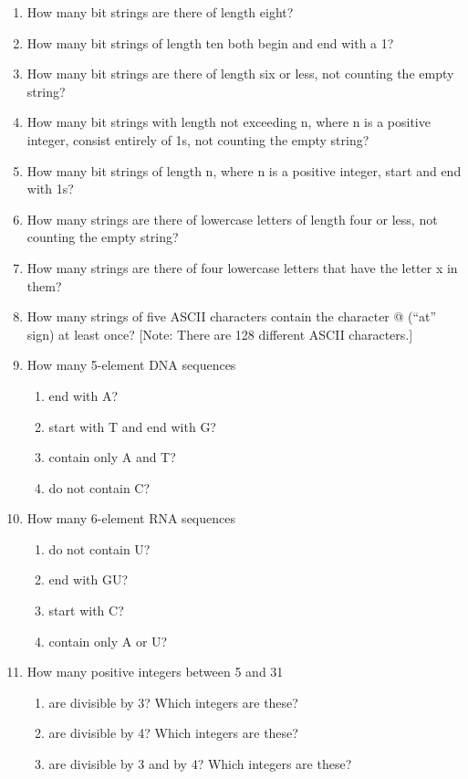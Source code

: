 \documentclass[11pt,a4paper]{book}
\begin{document}
\begin{enumerate}
\item How many bit strings are there of length eight?
\item How many bit strings of length ten both begin and end with a 1?
\item How many bit strings are there of length six or less, not counting the empty string?
\item How many bit strings with length not exceeding n, where n is a positive integer, consist entirely of 1s, not counting the empty string?
\item How many bit strings of length n, where n is a positive integer, start and end with 1s?
\item How many strings are there of lowercase letters of length four or less, not counting the empty string?
\item How many strings are there of four lowercase letters that have the letter x in them?
\item How many strings of five ASCII characters contain the character @ (“at” sign) at least once? [Note: There are 128 different ASCII characters.]
\item How many 5-element DNA sequences
\begin{enumerate}[label=(\alph*)]
\item end with A?
\item start with T and end with G?
\item contain only A and T?
\item do not contain C?
\end{enumerate}
\item How many 6-element RNA sequences
\begin{enumerate}[label=(\alph*)]
\item do not contain U?
\item end with GU?
\item start with C?
\item contain only A or U?
\end{enumerate}
\item How many positive integers between 5 and 31
\begin{enumerate}[label=(\alph*)]
\item are divisible by 3? Which integers are these?
\item are divisible by 4? Which integers are these?
\item are divisible by 3 and by 4? Which integers are these?

\end{enumerate}
\end{enumerate}
\end{document}
